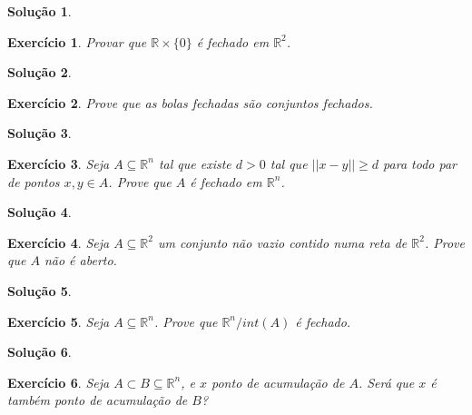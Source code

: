 \documentclass[a4paper,12pt]{article}
\newcommand{\R}{\mathbb{R}}
\theoremstyle{exer}
\newtheorem{exercise}{Exercício}
\theoremstyle{definition}
\newtheorem{solution}{Solução}
\theoremstyle{plain}
\begin{document}
\begin{solution}

\end{solution}

\begin{exercise}
    Provar que $\R \times \{0\}$ é fechado em $\R^2$.
\end{exercise}

\begin{solution}

\end{solution}

\begin{exercise}
    Prove que as bolas fechadas são conjuntos fechados.
\end{exercise}

\begin{solution}

\end{solution}

\begin{exercise}
    Seja $A \subseteq \R^n$ tal que existe $d > 0$ tal que $||x - y|| \ge d$
    para todo par de pontos $x, y \in A$. Prove que $A$ é fechado em $\R^n$.
\end{exercise}

\begin{solution}
  
\end{solution}

\begin{exercise}
    Seja $A \subseteq \R^2$ um conjunto não vazio contido numa reta de $\R^2$. Prove que $A$ não é
    aberto.
\end{exercise}

\begin{solution}
    
\end{solution}

\begin{exercise}
    Seja $A \subseteq \R^n$. Prove que $\R^n/int(A)$ é fechado.
\end{exercise}

\begin{solution}
 
\end{solution}

\begin{exercise}
    Seja $A \subset B \subseteq \R^n$, e $x$ ponto de acumulação de $A$. Será que $x$ é também ponto de
    acumulação de $B$?
\end{exercise}
\end{document}

